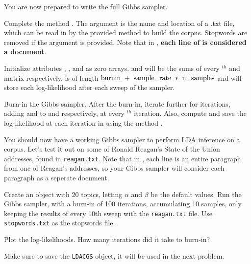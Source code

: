 You are now prepared to write the full Gibbs sampler.

\begin{problem}
Complete the method .
The argument  is the name and location of a .txt file, which can be read in by the provided method  to build the corpus. 
Stopwords are removed if the  argument is provided.
Note that in , \textbf{each line of}  \textbf{is considered a document}.

Initialize attributes , , and  as zero arrays.
 and  will be the sums of every $^{th}$  and  matrix respectively.
 is of length $\text{\li{burnin} } + \text{ \li{sample\_rate} } * \text{ \li{n\_samples}}$ and will store each log-likelihood after each sweep of the sampler.

Burn-in the Gibbs sampler.
After the burn-in, iterate further for  iterations, adding  and  to  and  respectively, at every $^{th}$ iteration.
Also, compute and save the log-likelihood at each iteration in  using the method .
\end{problem}

You should now have a working Gibbs sampler to perform LDA inference on a corpus.
Let's test it out on some of Ronald Reagan's State of the Union addresses, found in \texttt{reagan.txt}.
Note that in , each line is an entire paragraph from one of Reagan's addresses, so your Gibbs sampler will consider each paragraph as a seperate document.

\begin{problem}

Create an  object with 20 topics, letting $\alpha$ and $\beta$ be the default values.
Run the Gibbs sampler, with a burn-in of 100 iterations, accumulating 10 samples, only keeping the results of every 10th sweep with the \texttt{reagan.txt} file.
Use \texttt{stopwords.txt} as the stopwords file.

\noindent Plot the log-likelihoods. 
How many iterations did it take to burn-in?

Make sure to save the \texttt{LDACGS} object, it will be used in the next problem.
\end{problem}

